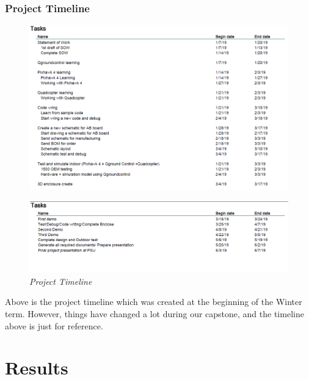 \documentclass[11pt]{article}
\begin{document}
\subsubsection{Project Timeline}

\begin{figure}[h!bt]
\centering	
\includegraphics[width=7 in]{timeline1}
\end{figure}

\begin{figure}[h!bt]
\centering	
\includegraphics[width=7 in]{timeline2}
\caption{\textit{Project Timeline}}	
\end{figure} 
\break

Above is the project timeline which was created at the beginning of the Winter term. However, things have changed a lot during our capstone, and the timeline above is just for reference.



\section{Results}
\end{document}
